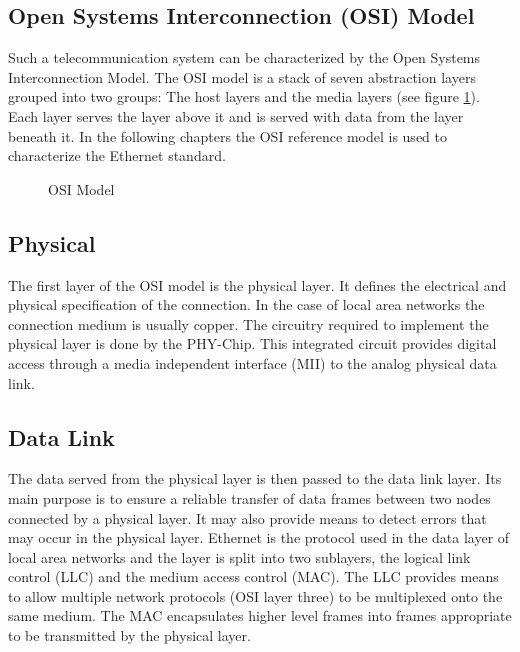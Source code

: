 \subsection{Open Systems Interconnection (OSI) Model}
Such a telecommunication system can be characterized by the Open Systems 
Interconnection Model. The OSI model is a stack of seven abstraction layers 
grouped into two groups: The host layers and the media layers (see figure \ref{fig:osi}). 
Each layer serves the layer above it and is served with data from the layer
beneath it. In the following chapters the OSI reference model is used to
characterize the Ethernet standard.

\begin{figure}[tb!]
    \centering
    \begin{adjustbox}{max width=0.7\linewidth}
        
    \end{adjustbox}
    \caption{OSI Model}
    \label{fig:osi}
\end{figure}


\subsection{Physical} \label{chapt:theory:physical}
The first layer of the OSI model is the physical layer. It defines the electrical and physical specification of the connection. In the case of local
area networks the connection medium is usually copper. The circuitry required to implement the physical layer is done by the PHY-Chip. This integrated circuit provides digital access through a media independent interface (MII) to the analog physical data link.


\subsection{Data Link} 
The data served from the physical layer is then passed to the data link layer.
Its main purpose is to ensure a reliable transfer of data frames between two
nodes connected by a physical layer. It may also provide means to detect errors
that may occur in the physical layer. Ethernet is the protocol used in the data
layer of local area networks and the layer is split into two sublayers, the logical link control (LLC) and the medium access control (MAC). The LLC provides means to allow multiple network protocols (OSI layer three) to be multiplexed onto the same medium. The MAC encapsulates higher level frames into frames appropriate to be transmitted by the physical layer.

